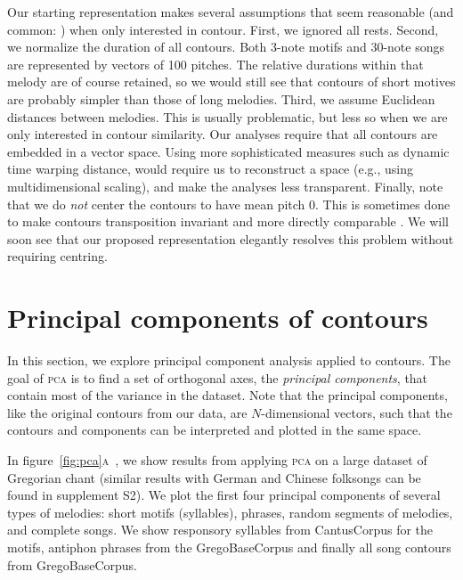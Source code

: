 \documentclass{article}
\begin{document}
Our starting representation makes several assumptions that seem reasonable (and common: \cite{Savage2017a,Tierney2011,Velarde2016}) when only interested in contour.
First, we ignored all rests.
Second, we normalize the duration of all contours.
Both 3-note motifs and 30-note songs are represented by vectors of 100 pitches.
The relative durations within that melody are of course retained, so we would still see that contours of short motives are probably simpler than those of long melodies.
Third, we assume Euclidean distances between melodies.
This is usually problematic, but less so when we are only interested in contour similarity.
Our analyses require that all contours are embedded in a vector space.
Using more sophisticated measures such as dynamic time warping distance, would require us to reconstruct a space (e.g., using multidimensional scaling), and make the analyses less transparent.
Finally, note that we do \emph{not} center the contours to have mean pitch 0.
This is sometimes done to make contours transposition invariant and more directly comparable \cite{Savage2017a,Velarde2016,Cornelissen2020DLfM}.
We will soon see that our proposed representation elegantly resolves this problem without requiring centring.


\section{Principal components of contours}\label{sec:pc}


In this section, we explore principal component analysis applied to contours.
The goal of \textsc{pca} is to find a set of orthogonal axes, the \emph{principal components}, that contain most of the variance in the dataset. Note that the principal components, like the original contours from our data, are $N$-dimensional vectors, such that the contours and components can be interpreted and plotted in the same space.


In figure~\ref{fig:pca}\textsc{a}~, we show results from applying \textsc{pca} on a large dataset of Gregorian chant (similar results with German and Chinese folksongs can be found in supplement S2). We plot the first four principal components of several types of melodies: short motifs (syllables), phrases, random segments of melodies, and complete songs.
We show responsory syllables from CantusCorpus for the motifs,
antiphon phrases from the GregoBaseCorpus 
and finally all song contours from GregoBaseCorpus.
\end{document}
